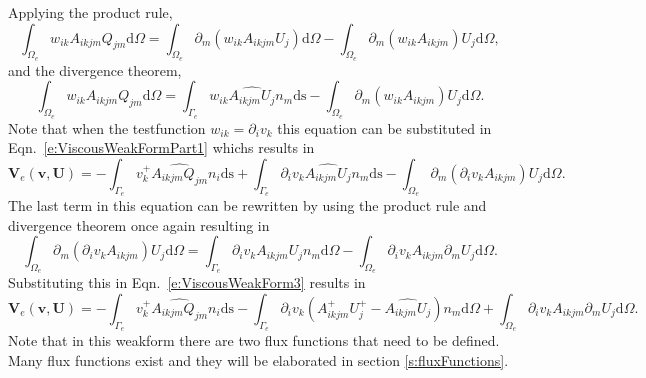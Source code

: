\documentclass{report}
\begin{document}
Applying the product rule,
\begin{equation}
\int_{\Omega_e} w_{ik} A_{ikjm} Q_{jm} \mathrm{d}\Omega 
= \int_{\Omega_e} \partial_m ({w_{ik} A_{ikjm} U_j}) \mathrm{d}\Omega
- \int_{\Omega_e} \partial_m (w_{ik} A_{ikjm}) U_j \mathrm{d}\Omega,
\end{equation}
and the divergence theorem,
\begin{equation}
\int_{\Omega_e} w_{ik} A_{ikjm} Q_{jm} \mathrm{d}\Omega 
= \int_{\Gamma_e} {w_{ik} \widehat{A_{ikjm} U_j}} n_m \mathrm{ds}
- \int_{\Omega_e} \partial_m (w_{ik} A_{ikjm}) U_j \mathrm{d}\Omega.
\end{equation}
Note that when the testfunction $w_{ik} = \partial_i v_k$ this equation can be substituted in Eqn.~\ref{e:ViscousWeakFormPart1} whichs results in
\begin{equation}
\label{e:ViscousWeakForm3}
\mathbf{V}_e(\mathbf{v},\mathbf{U}) = 
- \int_{\Gamma_e} v_k^{+} \widehat{{{A}_{ikjm} Q_{jm}}} n_i \mathrm{ds}
+ \int_{\Gamma_e} {\partial_i v_k \widehat{A_{ikjm} U_j}} n_m \mathrm{ds}
- \int_{\Omega_e} \partial_m (\partial_i v_k A_{ikjm}) U_j \mathrm{d}\Omega.
\end{equation}
The last term in this equation can be rewritten by using the product rule and divergence theorem once again resulting in
\begin{equation}
\int_{\Omega_e} \partial_m (\partial_i v_k A_{ikjm}) U_j \mathrm{d}\Omega
=  \int_{\Gamma_e} \partial_i v_k A_{ikjm} U_j n_m \mathrm{d}\Omega
- \int_{\Omega_e} \partial_i v_k A_{ikjm} \partial_m U_j \mathrm{d}\Omega.
\end{equation}
Substituting this in Eqn.~\ref{e:ViscousWeakForm3} results in
\begin{equation}
\mathbf{V}_e(\mathbf{v},\mathbf{U}) = 
- \int_{\Gamma_e} v_k^{+} \widehat{{{A}_{ikjm} Q_{jm}}} n_i \mathrm{ds}
- \int_{\Gamma_e} \partial_i v_k (A_{ikjm}^+ U_j^{+} - \widehat{A_{ikjm} U_j})n_m \mathrm{d}\Omega
+ \int_{\Omega_e} \partial_i v_k A_{ikjm} \partial_m U_j \mathrm{d}\Omega.
\end{equation}
Note that in this weakform there are two flux functions that need to be defined. Many flux functions exist and they will be elaborated in section \ref{s:fluxFunctions}.
\end{document}
